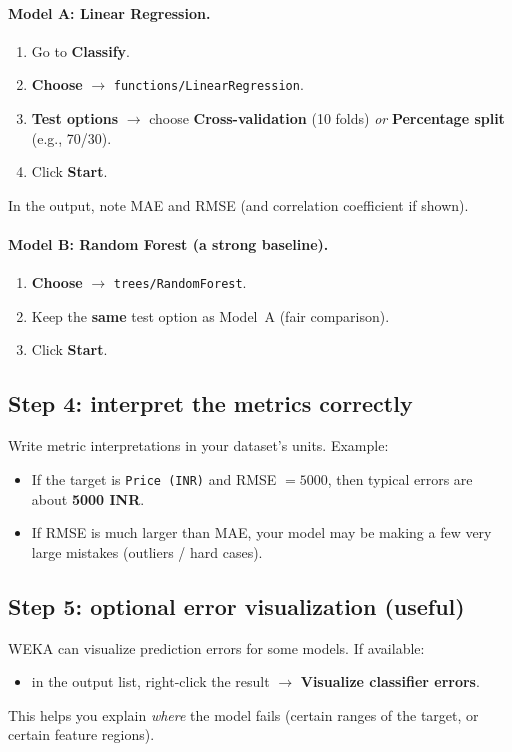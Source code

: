 \documentclass[11pt]{article}
\begin{document}
\paragraph{Model A: Linear Regression.}
\begin{enumerate}[leftmargin=*]
  \item Go to \textbf{Classify}.
  \item \textbf{Choose} $\rightarrow$ \texttt{functions/LinearRegression}.
  \item \textbf{Test options} $\rightarrow$ choose \textbf{Cross-validation} (10 folds) \emph{or} \textbf{Percentage split} (e.g., 70/30).
  \item Click \textbf{Start}.
\end{enumerate}
In the output, note MAE and RMSE (and correlation coefficient if shown).

\paragraph{Model B: Random Forest (a strong baseline).}
\begin{enumerate}[leftmargin=*]
  \item \textbf{Choose} $\rightarrow$ \texttt{trees/RandomForest}.
  \item Keep the \textbf{same} test option as Model~A (fair comparison).
  \item Click \textbf{Start}.
\end{enumerate}

\subsection{Step 4: interpret the metrics correctly}
Write metric interpretations in your dataset's units. Example:
\begin{itemize}[leftmargin=*]
  \item If the target is \texttt{Price (INR)} and RMSE $= 5000$, then typical errors are about \textbf{5000 INR}.
  \item If RMSE is much larger than MAE, your model may be making a few very large mistakes (outliers / hard cases).
\end{itemize}

\subsection{Step 5: optional error visualization (useful)}
WEKA can visualize prediction errors for some models.
If available:
\begin{itemize}[leftmargin=*]
  \item in the output list, right-click the result $\rightarrow$ \textbf{Visualize classifier errors}.
\end{itemize}
This helps you explain \emph{where} the model fails (certain ranges of the target, or certain feature regions).
\end{document}
